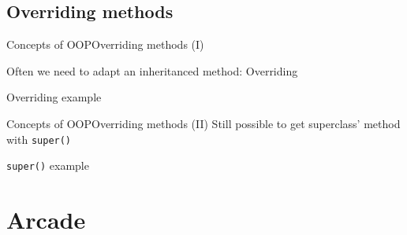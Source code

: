 \documentclass[10pt,compress]{beamer} %
\begin{document}
\subsection{Overriding methods}

\begin{frame}{Concepts of OOP}{Overriding methods (I)}

	Often we need to adapt an inheritanced method: \alert{Overriding}

	\begin{exampleblock}{Overriding example}
		\vspace{-0.2cm}
		
		\vspace{-0.2cm}
	\end{exampleblock}
\end{frame}
	
\begin{frame}{Concepts of OOP}{Overriding methods (II)}
		Still possible to get superclass' method with \texttt{super()}

	\begin{exampleblock}{\texttt{super()} example}
		\vspace{-0.2cm}
		
		\vspace{-0.2cm}
	\end{exampleblock}
\end{frame}

\section{Arcade}

\begin{frame}[plain]
	\begin{exampleblock}{}
		\vspace{-0.2cm}
		
		\vspace{-0.2cm}
	\end{exampleblock}
\end{frame}

\begin{frame}[plain]
	\begin{exampleblock}{}
		\vspace{-0.2cm}
		
		\vspace{-0.2cm}
	\end{exampleblock}
\end{frame}
\end{document}
